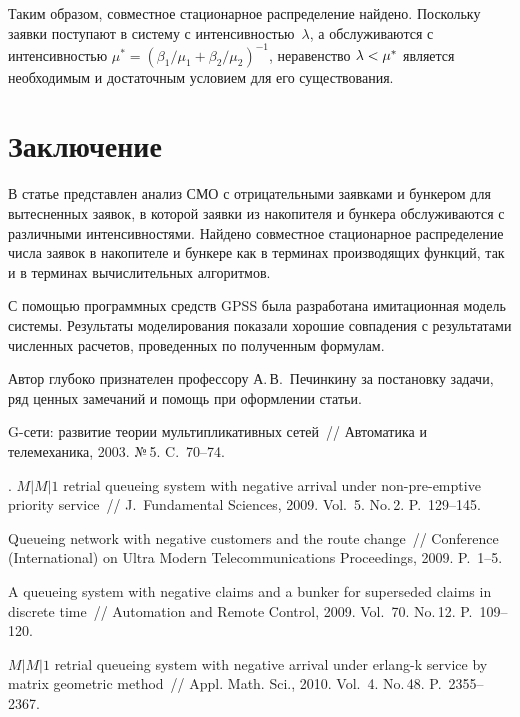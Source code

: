 \begin{multicols}{2}
Таким образом, совместное стационарное распределение
найдено. Поскольку заявки поступают в систему с интенсивностью~$\lambda$,
а обслуживаются с интенсивностью
$\mu^{*}= \left ( {\beta_1}/{\mu_1} + {\beta_2}/{\mu_2} \right )^{-1}$,
неравенство $\lambda \hm< \mu^{*}$ является необходимым и достаточным условием
для его существования.

\section{Заключение}

В статье представлен анализ СМО с отрицательными заявками
и бункером для вытесненных заявок, в которой заявки из накопителя
и бункера обслуживаются с различными интенсивностями.
Найдено совместное стационарное распределение числа
заявок в накопителе и бункере как в терминах производящих функций,
так и в терминах вычислительных алгоритмов.

С помощью программных средств GPSS 
была разработана имитационная модель системы. Результаты моделирования показали
хорошие совпадения с результатами численных расчетов, проведенных по полученным формулам.

\bigskip
Автор глубоко признателен профессору А.\,В.~Печинкину за постановку задачи, 
ряд ценных замечаний и помощь при оформлении статьи.

{\small\frenchspacing
{%
\begin{thebibliography}{99}

G-сети: развитие теории мультипликативных сетей~//
Автоматика и телемеханика, 2003. №\,5. C.~70--74.


.
$M|M|1$ retrial queueing system with negative arrival under
non-pre-emptive priority service~// J.~Fundamental Sciences,
2009. Vol.~5. No.\,2. P.~129--145.

Queueing network with negative customers and the route change~//
 Conference (International) on Ultra Modern Telecommunications Proceedings, 2009. P.~1--5.

A queueing system with negative claims and a bunker for superseded claims in discrete time~//
Automation and Remote Control, 2009. Vol.~70. No.\,12. P.~109--120.

$M|M|1$ retrial queueing system with negative
arrival under erlang-k service by matrix
geometric method~//
Appl. Math. Sci., 2010. Vol.~4. No.\,48. P.~2355--2367.


\end{thebibliography}}}
\end{multicols}
